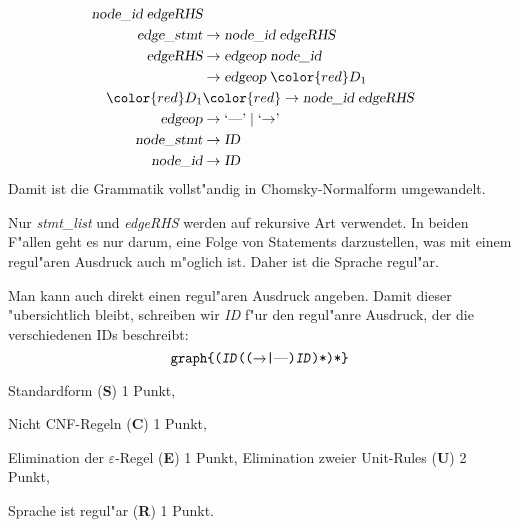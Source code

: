 \begin{loesung}
\begin{teilaufgaben}
\begin{align*}
                                \textsl{node\_id}\; \textsl{edgeRHS} \\
\textsl{edge\_stmt}&\rightarrow \textsl{node\_id}\; \textsl{edgeRHS} \\
\textsl{edgeRHS}   &\rightarrow \textsl{edgeop}\; \textsl{node\_id}\\
                   &\rightarrow \textsl{edgeop}\; \color{red}D_1\\
\color{red}D_1     &\color{red}\rightarrow \textsl{node\_id}\; \textsl{edgeRHS}\\
\textsl{edgeop}    &\rightarrow \textrm{`\text{---}'}\; |\; \textrm{`$\rightarrow$'}\; \\
\textsl{node\_stmt}&\rightarrow \textsl{ID} \\
\textsl{node\_id}  &\rightarrow \textsl{ID}
\end{align*}
Damit ist die Grammatik vollst"andig in Chomsky-Normalform umgewandelt.
\item Nur \textsl{stmt\_list} und \textsl{edgeRHS} werden auf rekursive
Art verwendet. In beiden F"allen geht es nur darum, eine Folge von
Statements darzustellen, was mit einem regul"aren Ausdruck auch m"oglich ist.
Daher ist die Sprache regul"ar.

Man kann auch direkt einen regul"aren Ausdruck angeben. Damit dieser "ubersichtlich
bleibt, schreiben wir \textsl{ID} f"ur den regul"anre Ausdruck, der die verschiedenen
IDs beschreibt:
\[
\texttt{graph\{%
(\textsl{ID}(($\rightarrow$|\textrm{---})\textsl{ID})*)*%
\}}
\]
\end{teilaufgaben}
\end{loesung}

\begin{bewertung}
\begin{teilaufgaben}
\item Standardform (\textbf{S}) 1 Punkt,
\item Nicht CNF-Regeln (\textbf{C}) 1 Punkt,
\item Elimination der $\varepsilon$-Regel (\textbf{E}) 1 Punkt,
Elimination zweier Unit-Rules (\textbf{U}) 2 Punkt,
\item Sprache ist regul"ar (\textbf{R}) 1 Punkt.
\end{teilaufgaben}
\end{bewertung}
